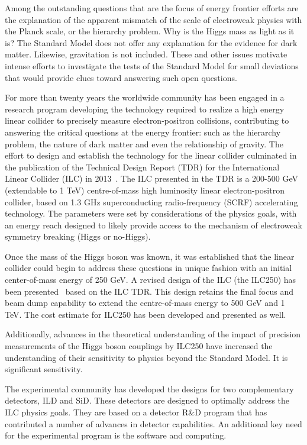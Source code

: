 \documentclass[%
 reprint,
 amsmath,amssymb,
 aps,
]{revtex4-1}
\begin{document}
Among the outstanding questions that are the focus of energy frontier
efforts are the explanation of the apparent mismatch of the scale of
electroweak physics with the Planck scale, or the hierarchy problem.
Why is the Higgs mass as light as it is?
The Standard Model does not offer any explanation for the evidence for dark matter.
Likewise, gravitation is not included.  These and other issues
motivate intense efforts to investigate the tests of the Standard Model
for small deviations that would provide clues toward answering such
open questions.

For more than twenty years the worldwide community has been engaged in a research
program developing the technology required to realize a high energy linear collider
to precisely measure electron-positron collisions, contributing to 
answering the critical questions at the energy frontier: such as the hierarchy problem,
the nature of dark matter and even the relationship of gravity.
The effort to design and establish the technology for the linear collider 
culminated in the publication of the Technical Design Report (TDR)
for the International Linear Collider (ILC) in 2013~\cite{Behnke:2013xla}.
The ILC presented in the TDR is a 200-500 GeV (extendable to 1 TeV) centre-of-mass 
high luminosity
linear electron-positron collider, based on 1.3 GHz superconducting radio-frequency (SCRF)
accelerating technology. 
The parameters were set by considerations of the physics goals,
with an energy reach designed to likely provide access to the mechanism of 
electroweak symmetry breaking (Higgs or no-Higgs).

Once the mass of the Higgs boson was known, it was established that the
linear collider could begin to address these questions in unique fashion
with an initial center-of-mass energy of 250 GeV.
A revised design of the ILC (the ILC250) has been presented~\cite{Evans:2017rvt}
based on the ILC TDR.  This design retains the final focus and beam dump
 capability to extend the
centre-of-mass energy to 500 GeV and 1 TeV.  The cost estimate for ILC250 has 
been developed and presented as well.

Additionally, advances in the theoretical understanding of the impact of precision
measurements of the Higgs boson couplings by ILC250 have increased the understanding
of their sensitivity to physics beyond the Standard Model.  It is significant sensitivity.

The experimental community has developed the designs for two complementary detectors,
ILD and SiD.  These detectors are designed to optimally address the
ILC physics goals.  They are based on a detector R\&D program that has
contributed a number of advances in detector capabilities.
An additional key need for the experimental program is the software and computing.
\end{document}

